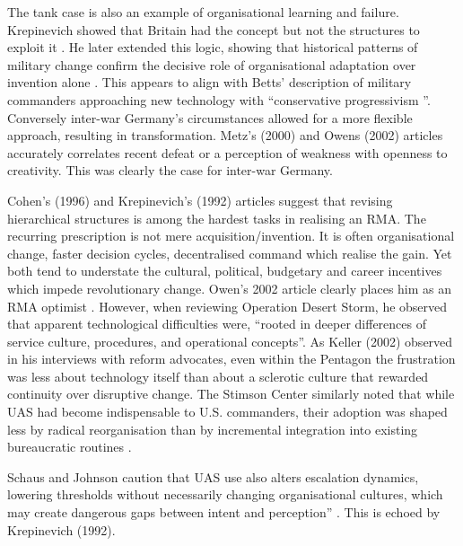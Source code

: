 The tank case is also an example of organisational learning and failure. Krepinevich showed that Britain had the concept but not the structures to exploit it \parencite{KREP_1992}. He later extended this logic, showing that historical patterns of military change confirm the decisive role of organisational adaptation over invention alone \parencite{KREP_1994}. This appears to align with Betts' description of military commanders approaching new technology with ``conservative progressivism  ''\parencite{BETTS_1996}.  Conversely inter-war Germany's circumstances allowed for a more flexible approach, resulting in transformation. Metz's (2000) and Owens (2002) articles accurately correlates recent defeat or a perception of weakness with openness to creativity\nocite{METZ_2000,OWENS_2002}. This was clearly the case for inter-war Germany.



Cohen's (1996) and Krepinevich's (1992) articles suggest that revising hierarchical structures is among the hardest tasks in realising an RMA. The recurring prescription is not mere acquisition/invention. It is often organisational change, faster decision cycles, decentralised command which realise the gain. Yet both tend to understate the cultural, political, budgetary and career incentives which impede revolutionary change\nocite{COHEN_1995,COHEN_1996,KREP_1992}. Owen's 2002 article clearly places him as an RMA optimist \nocite{OWENS_2002}. However, when reviewing Operation Desert Storm, he observed that apparent technological difficulties were, ``rooted in deeper differences of service culture, procedures, and operational concepts''. As Keller (2002) observed in his interviews with reform advocates, even within the Pentagon the frustration was less about technology itself than about a sclerotic culture that rewarded continuity over disruptive change\nocite{KELLER_2002}. The Stimson Center similarly noted that while UAS had become indispensable to U.S. commanders, their adoption was shaped less by radical reorganisation than by incremental integration into existing bureaucratic routines \parencite{STIMSON_2015}.

 Schaus and Johnson caution that UAS use also alters escalation dynamics, lowering thresholds without necessarily changing organisational cultures, which may create dangerous gaps between intent and perception” \parencite{SCHAUS_2018}. This is echoed by Krepinevich (1992).


